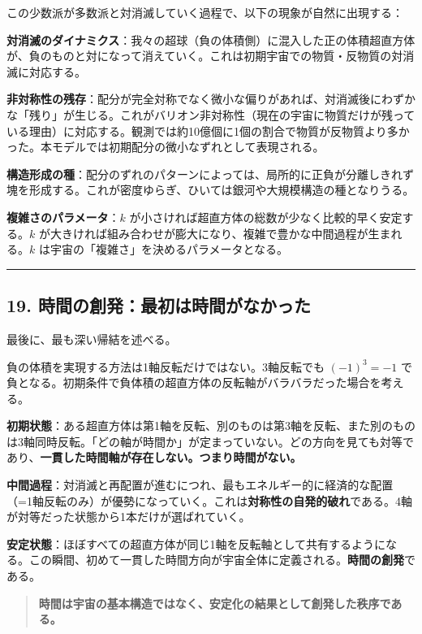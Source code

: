 \documentclass[a4paper,11pt]{ltjsarticle}
\theoremstyle{definition}
\begin{document}
この少数派が多数派と対消滅していく過程で、以下の現象が自然に出現する：

\textbf{対消滅のダイナミクス}：我々の超球（負の体積側）に混入した正の体積超直方体が、負のものと対になって消えていく。これは初期宇宙での物質・反物質の対消滅に対応する。

\textbf{非対称性の残存}：配分が完全対称でなく微小な偏りがあれば、対消滅後にわずかな「残り」が生じる。これがバリオン非対称性（現在の宇宙に物質だけが残っている理由）に対応する。観測では約10億個に1個の割合で物質が反物質より多かった。本モデルでは初期配分の微小なずれとして表現される。

\textbf{構造形成の種}：配分のずれのパターンによっては、局所的に正負が分離しきれず塊を形成する。これが密度ゆらぎ、ひいては銀河や大規模構造の種となりうる。

\textbf{複雑さのパラメータ}：\(k\)
が小さければ超直方体の総数が少なく比較的早く安定する。\(k\)
が大きければ組み合わせが膨大になり、複雑で豊かな中間過程が生まれる。\(k\)
は宇宙の「複雑さ」を決めるパラメータとなる。

\begin{center}\rule{0.5\linewidth}{0.5pt}\end{center}

\subsection{19.
時間の創発：最初は時間がなかった}\label{ux6642ux9593ux306eux5275ux767aux6700ux521dux306fux6642ux9593ux304cux306aux304bux3063ux305f}

最後に、最も深い帰結を述べる。

負の体積を実現する方法は1軸反転だけではない。3軸反転でも \((-1)^3 = -1\)
で負となる。初期条件で負体積の超直方体の反転軸がバラバラだった場合を考える。

\textbf{初期状態}：ある超直方体は第1軸を反転、別のものは第3軸を反転、また別のものは3軸同時反転。「どの軸が時間か」が定まっていない。どの方向を見ても対等であり、\textbf{一貫した時間軸が存在しない。つまり時間がない。}

\textbf{中間過程}：対消滅と再配置が進むにつれ、最もエネルギー的に経済的な配置（=1軸反転のみ）が優勢になっていく。これは\textbf{対称性の自発的破れ}である。4軸が対等だった状態から1本だけが選ばれていく。

\textbf{安定状態}：ほぼすべての超直方体が同じ1軸を反転軸として共有するようになる。この瞬間、初めて一貫した時間方向が宇宙全体に定義される。\textbf{時間の創発}である。

\begin{quote}
\textbf{時間は宇宙の基本構造ではなく、安定化の結果として創発した秩序である。}
\end{quote}
\end{document}
